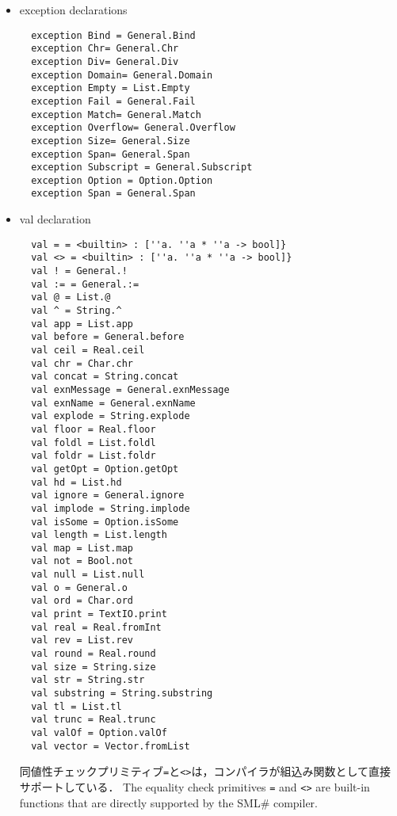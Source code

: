 \documentclass{jbook}
\newcommand{\txt}[2]{#2}
\newcommand{\smlsharp}{SML\#}
\newcommand{\code}[1]{\mbox{\large\tt #1}}
\begin{document}
\begin{itemize}
\item {\txt{exception宣言}{exception declarations}}
\begin{verbatim}
  exception Bind = General.Bind
  exception Chr= General.Chr
  exception Div= General.Div
  exception Domain= General.Domain
  exception Empty = List.Empty
  exception Fail = General.Fail
  exception Match= General.Match
  exception Overflow= General.Overflow
  exception Size= General.Size
  exception Span= General.Span
  exception Subscript = General.Subscript
  exception Option = Option.Option
  exception Span = General.Span
\end{verbatim}
\item {\txt{val宣言}{val declaration}}
\begin{verbatim}
  val = = <builtin> : [''a. ''a * ''a -> bool]}
  val <> = <builtin> : [''a. ''a * ''a -> bool]}
  val ! = General.!
  val := = General.:=
  val @ = List.@
  val ^ = String.^
  val app = List.app
  val before = General.before
  val ceil = Real.ceil
  val chr = Char.chr
  val concat = String.concat
  val exnMessage = General.exnMessage
  val exnName = General.exnName
  val explode = String.explode
  val floor = Real.floor
  val foldl = List.foldl
  val foldr = List.foldr
  val getOpt = Option.getOpt
  val hd = List.hd
  val ignore = General.ignore
  val implode = String.implode
  val isSome = Option.isSome
  val length = List.length
  val map = List.map
  val not = Bool.not
  val null = List.null
  val o = General.o
  val ord = Char.ord
  val print = TextIO.print
  val real = Real.fromInt
  val rev = List.rev
  val round = Real.round
  val size = String.size
  val str = String.str
  val substring = String.substring
  val tl = List.tl
  val trunc = Real.trunc
  val valOf = Option.valOf
  val vector = Vector.fromList
\end{verbatim}
\ifjp%
	同値性チェックプリミティブ\code{=}と\code{<>}は，コンパイラが組込み関数として直接
サポートしている．
\else%
	The equality check primitives \code{=} and \code{<>} are
built-in functions that are directly supported by the \smlsharp{} compiler.
\fi%



\end{itemize}
\end{document}
